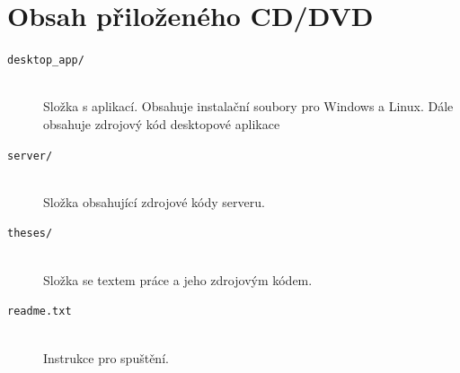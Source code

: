 \documentclass[
  glossaries,
]{kidiplom}
\begin{document}
\appendix
\section{Obsah přiloženého CD/DVD} \label{sec:ObsahCD}
\begin{description}

\item[\texttt{desktop\_app/}] \hfill \\
 Složka s aplikací. Obsahuje instalační soubory pro Windows a Linux. Dále obsahuje zdrojový kód desktopové aplikace

\item[\texttt{server/}] \hfill \\
   Složka obsahující zdrojové kódy serveru.
   
\item[\texttt{theses/}] \hfill \\
Složka se textem práce a jeho zdrojovým kódem.

\item[\texttt{readme.txt}] \hfill \\
  Instrukce pro spuštění.
 

\end{description}
\end{document}
